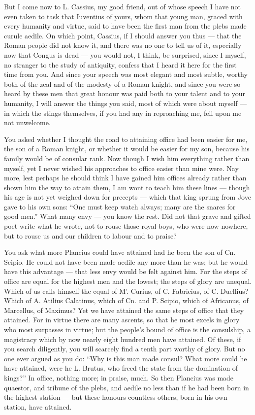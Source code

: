  But I come now to L. Cassius, my good friend, out of whose speech I have not even taken to task that Iuventius of yours, whom that young man, graced with every humanity and virtue, said to have been the first man from the plebs made curule aedile. On which point, Cassius, if I should answer you thus --- that the Roman people did not know it, and there was no one to tell us of it, especially now that Congus is dead --- you would not, I think, be surprised, since I myself, no stranger to the study of antiquity, confess that I heard it here for the first time from you. And since your speech was most elegant and most subtle, worthy both of the zeal and of the modesty of a Roman knight, and since you were so heard by these men that great honour was paid both to your talent and to your humanity, I will answer the things you said, most of which were about myself --- in which the stings themselves, if you had any in reproaching me, fell upon me not unwelcome.

 You asked whether I thought the road to attaining office had been easier for me, the son of a Roman knight, or whether it would be easier for my son, because his family would be of consular rank. Now though I wish him everything rather than myself, yet I never wished his approaches to office easier than mine were. Nay more, lest perhaps he should think I have gained him offices already rather than shown him the way to attain them, I am wont to teach him these lines --- though his age is not yet weighed down for precepts --- which that king sprung from Jove gave to his own sons: ``One must keep watch always; many are the snares for good men.'' What many envy --- you know the rest. Did not that grave and gifted poet write what he wrote, not to rouse those royal boys, who were now nowhere, but to rouse us and our children to labour and to praise?

 You ask what more Plancius could have attained had he been the son of Cn. Scipio. He could not have been made aedile any more than he was; but he would have this advantage --- that less envy would be felt against him. For the steps of office are equal for the highest men and the lowest; the steps of glory are unequal. Which of us calls himself the equal of M'. Curius, of C. Fabricius, of C. Duellius? Which of A. Atilius Calatinus, which of Cn. and P. Scipio, which of Africanus, of Marcellus, of Maximus? Yet we have attained the same steps of office that they attained. For in virtue there are many ascents, so that he most excels in glory who most surpasses in virtue; but the people's bound of office is the consulship, a magistracy which by now nearly eight hundred men have attained. Of these, if you search diligently, you will scarcely find a tenth part worthy of glory. But no one ever argued as you do: ``Why is this man made consul? What more could he have attained, were he L. Brutus, who freed the state from the domination of kings?'' In office, nothing more; in praise, much. So then Plancius was made quaestor, and tribune of the plebs, and aedile no less than if he had been born in the highest station --- but these honours countless others, born in his own station, have attained.

